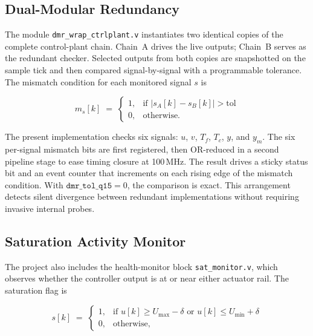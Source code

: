 \subsection{Dual-Modular Redundancy}
\label{ssec:bench_dmr_logic}

The module \texttt{dmr\_wrap\_ctrlplant.v} instantiates two identical
copies of the complete control-plant chain.  Chain~A drives the live
outputs; Chain~B serves as the redundant checker.  Selected outputs from
both copies are snapshotted on the sample tick and then compared
signal-by-signal with a programmable tolerance.  The mismatch condition
for each monitored signal $s$ is

\begin{equation}
  m_s[k] \;=\;
  \begin{cases}
    1, & \text{if } \lvert s_A[k] - s_B[k] \rvert > \mathrm{tol} \\
    0, & \text{otherwise.}
  \end{cases}
  \label{eq:dmr_mismatch}
\end{equation}

The present implementation checks six signals: $u$, $v$, $T_f$, $T_c$,
$y$, and $y_m$.  The six per-signal mismatch bits are first registered,
then OR-reduced in a second pipeline stage to ease timing closure at
100\,MHz.  The result drives a sticky status bit and an event counter
that increments on each rising edge of the mismatch condition.  With
$\texttt{dmr\_tol\_q15} = 0$, the comparison is exact.  This
arrangement detects silent divergence between redundant implementations
without requiring invasive internal probes.

\subsection{Saturation Activity Monitor}
\label{ssec:bench_sat_mon}

The project also includes the health-monitor block
\texttt{sat\_monitor.v}, which observes whether the controller output is
at or near either actuator rail.  The saturation flag is

\begin{equation}
  s[k] \;=\;
  \begin{cases}
    1, & \text{if } u[k] \ge U_{\max} - \delta
         \text{ or } u[k] \le U_{\min} + \delta \\
    0, & \text{otherwise,}
  \end{cases}
  \label{eq:sat_flag}
\end{equation}

